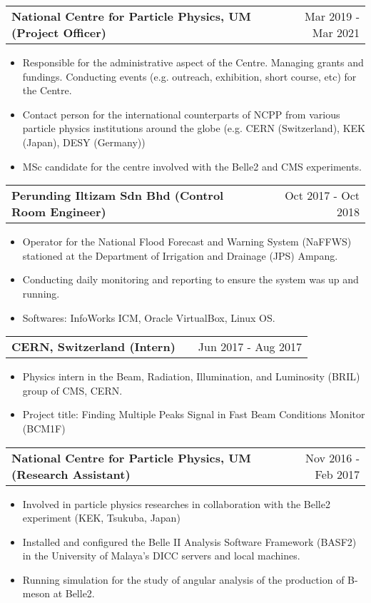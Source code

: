 \documentclass[a4paper,12pt]{article}
\makeatletter
\newenvironment{joblong}[2]
    {
    \begin{tabularx}{\linewidth}{@{}l X r@{}}
    \textbf{#1} & \hfill &  #2 \\[3.75pt]
    \end{tabularx}
    \begin{minipage}[t]{\linewidth}
    \begin{itemize}[nosep,after=\strut, leftmargin=1em, itemsep=3pt,label=--]
    }
    {
    \end{itemize}
    \end{minipage}    
    }
\makeatother
\begin{document}
\begin{joblong}{National Centre for Particle Physics, UM (Project Officer)}{Mar 2019 - Mar 2021}
\item Responsible for the administrative aspect of the Centre. Managing grants and fundings. Conducting events (e.g. outreach, exhibition, short course, etc) for the Centre.
\item Contact person for the international counterparts of NCPP from various particle physics institutions around the globe (e.g. CERN (Switzerland), KEK (Japan), DESY (Germany))
\item MSc candidate for the centre involved with the Belle2 and CMS experiments.
\end{joblong}

\begin{joblong}{Perunding Iltizam Sdn Bhd (Control Room Engineer)}{Oct 2017 - Oct 2018}
\item Operator for the National Flood Forecast and Warning System (NaFFWS) stationed at the Department of Irrigation and Drainage (JPS) Ampang.
\item Conducting daily monitoring and reporting to ensure the system was up and running.
\item Softwares: InfoWorks ICM, Oracle VirtualBox, Linux OS.
\end{joblong}

\begin{joblong}{CERN, Switzerland (Intern)}{Jun 2017 - Aug 2017}
\item Physics intern in the Beam, Radiation, Illumination, and Luminosity (BRIL) group of CMS, CERN.
\item Project title: Finding Multiple Peaks Signal in Fast Beam Conditions Monitor (BCM1F)
\end{joblong}

\begin{joblong}{National Centre for Particle Physics, UM (Research Assistant)}{Nov 2016 - Feb 2017}
\item Involved in particle physics researches in collaboration with the Belle2 experiment (KEK, Tsukuba, Japan)
\item Installed and configured the Belle II Analysis Software Framework (BASF2) in the University of Malaya’s DICC servers and local machines.
\item Running simulation for the study of angular analysis of the production of B-meson at Belle2.
\end{joblong}
\end{document}
